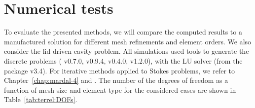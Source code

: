\section{Numerical tests}
\label{sec:terrel:Results}

To evaluate the presented methods, we will compare the computed
results to a manufactured solution for different mesh refinements
and element orders. We also consider the lid driven cavity problem.
All simulations used \fenics{} tools to generate the discrete
problems (\ffc{} v0.7.0, \dolfin{} v0.9.4, \ufl{} v0.4.0, \ufc{}
v1.2.0), with the  LU solver (from the
 package v3.4).  For iterative methods
applied to Stokes problems, we refer to Chapter~\ref{chap:mardal-4}
and \citet{ElmanSilvesterWathen2005}.  The number of the degrees of
freedom as a function of mesh size and element type for the considered
cases are shown in Table~\ref{tab:terrel:DOFs}.

